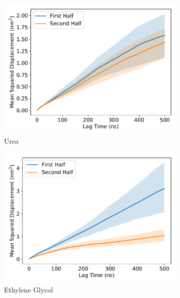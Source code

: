 \documentclass{article}
\begin{document}
  \begin{figure}[h]
  \centering
  \begin{subfigure}{0.45\textwidth}
  \includegraphics[width=\textwidth]{URE_MSD_halves.pdf}
  \caption{Urea}\label{fig:URE_MSD_halves}
  \end{subfigure}
  \begin{subfigure}{0.45\textwidth}
  \includegraphics[width=\textwidth]{GCL_MSD_halves.pdf}
  \caption{Ethylene Glycol}\label{fig:GCL_MSD_halves}
  \end{subfigure}
  \begin{subfigure}{0.45\textwidth}

\end{subfigure}
\end{figure}
\end{document}
